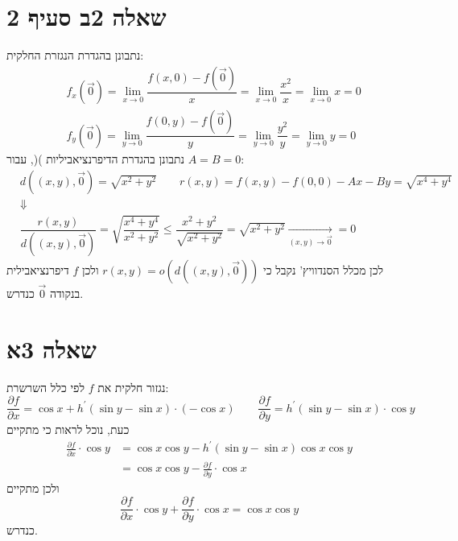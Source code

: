 \documentclass[11pt, oneside]{article}
\newcommand{\qed}{\R{$\blacksquare$}}
\newcommand{\br}{\\\\\\\\}
\newcommand{\opr}[1]{\xrightarrow[\text{#1}]{}}
\newcommand{\m}[3]{\R{משפט #3#2.#1}}
\renewcommand{\pd}[2]{\frac{\partial #1}{\partial #2}}
\begin{document}
\section*{שאלה 2ב סעיף 2}
נתבונן בהגדרת הנגזרת החלקית:
\begin{eqnarray*}
&f_{x}(\vec{0})
= \lim_{x \to 0} \dfrac{f(x, 0) - f(\vec{0})}{x}
= \lim_{x \to 0} \dfrac{x^{2}}{x} = \lim_{x \to 0} x = 0\\
&f_{y}(\vec{0})
= \lim_{y \to 0} \dfrac{f(0, y) - f(\vec{0})}{y}
= \lim_{y \to 0} \dfrac{y^{2}}{y} = \lim_{y \to 0} y = 0
\end{eqnarray*}
נתבונן בהגדרת הדיפרנציאביליות )\m{7}{26}{}(, עבור $A = B = 0$:
\begin{eqnarray*}
&d((x, y), \vec{0}) = \sqrt{x^{2} + y^{2}} \quad\quad r(x, y) = f(x, y) - f(0, 0) - Ax - By = \sqrt{x^{4} + y^{4}}\\
&\Downarrow\\
&\dfrac{r(x, y)}{d((x, y), \vec{0})} = \sqrt{\dfrac{x^{4} + y^{4}}{x^{2} + y^{2}}} \le \dfrac{x^{2} + y^{2}}{\sqrt{x^{2} + y^{2}}} = \sqrt{x^{2} + y^{2}} \opr{$(x, y) \to \vec{0}$} = 0
\end{eqnarray*}
לכן מכלל הסנדוויץ' נקבל כי $r(x, y) = o(d((x, y), \vec{0}))$ ולכן $f$ דיפרנציאבילית בנקודה $\vec{0}$ כנדרש. \qed
\clearpage

\section*{שאלה 3א}
נגזור חלקית את $f$ לפי כלל השרשרת:
\[
\pd{f}{x} = \cos{x} + h^{\prime}(\sin{y} - \sin{x}) \cdot (-\cos{x}) \quad\quad
\pd{f}{y} = h^{\prime}(\sin{y} - \sin{x}) \cdot \cos{y}
\]
כעת, נוכל לראות כי מתקיים
\begin{align*}
\pd{f}{x} \cdot \cos{y}
&= \cos{x}\cos{y} - h^{\prime}(\sin{y} - \sin{x}) \cos{x}\cos{y}\\
&= \cos{x}\cos{y} - \pd{f}{y} \cdot \cos{x}
\end{align*}
ולכן מתקיים
\[
\pd{f}{x} \cdot \cos{y} + \pd{f}{y} \cdot \cos{x} = \cos{x}\cos{y}
\]
כנדרש.
\br\qed
\end{document}

